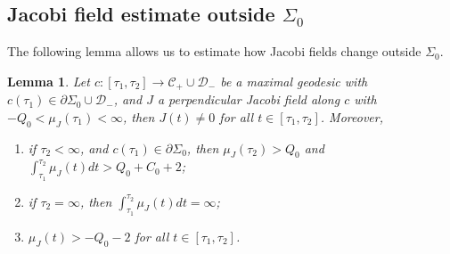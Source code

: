 \documentclass[JEP,XML,SOM,Unicode,NoFloatCountersInSection]{cedram}
\newenvironment{enumeratei}
{\bgroup\def\theenumi{\roman{enumi}}\def\theenumii{\arabic{enumii}}\begin{enumerate}}
{\end{enumerate}\egroup}
\newtheorem{lemma}[theorem]{Lemma}
\theoremstyle{definition}
\renewcommand{\>}{{\rangle}}
\newcommand{\<}{{\langle}}
\begin{document}
\subsection{Jacobi field estimate outside \texorpdfstring{$\Sigma_0$}{Sigma}}

The following lemma allows us to estimate how Jacobi fields change outside $\Sigma_0$.
\begin{lemma}\label{lem: mu_change_NSigma}
Let $c: [\tau_1,\tau_2]\to \mathcal{C}_+\cup\mathcal{D}_-$ be a maximal geodesic with $c(\tau_1)\in \partial\Sigma_0\cup \mathcal{D}_-$, and
$J$ a perpendicular Jacobi field along $c$ with $-Q_0<\mu_J(\tau_1)<\infty$, then $J(t)\neq 0$ for all $t\in[\tau_1,\tau_2]$. Moreover,
\begin{enumeratei}
\item\label{lem: mu_change_NSigmai}\label{tau2_finite} if $\tau_2<\infty$, and $c(\tau_1)\in \partial\Sigma_0$, then $\mu_J(\tau_2)>Q_0$ and $\int_{\tau_1}^{\tau_2}\mu_J(t)dt>Q_0+C_0+2$;

\item\label{tau2_infinite} if $\tau_2=\infty$, then $\int_{\tau_1}^{\tau_2}\mu_J(t)dt=\infty$;

\item\label{boundontau12} $\mu_J(t)>-Q_0-2$ for all $t\in[\tau_1,\tau_2]$.
\end{enumeratei}
\end{lemma}
\end{document}

